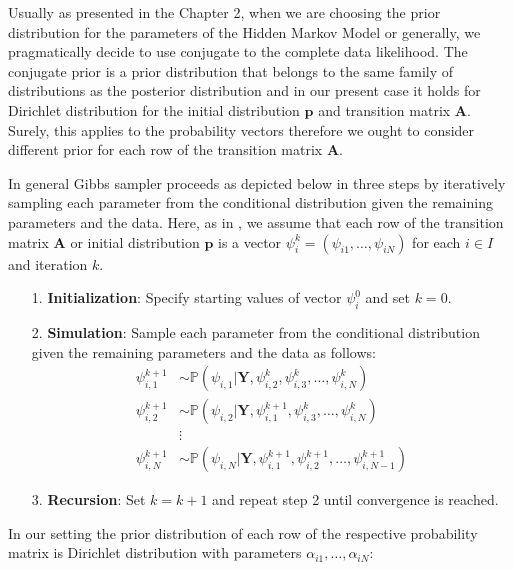 Usually as presented in the Chapter 2, when we are choosing the prior distribution for the parameters of the Hidden Markov Model or generally, we pragmatically
decide to use conjugate to the complete data likelihood. The conjugate prior is a prior distribution that belongs to the same family of distributions 
as the posterior distribution and in our present case it holds for Dirichlet distribution for the initial distribution $\textbf{p}$ and transition matrix $\textbf{A}$.
Surely, this applies to the probability vectors therefore we ought to consider different prior for each row of the transition matrix $\textbf{A}$. \citep{Rydén2008}

In general Gibbs sampler proceeds as depicted below in three steps by iteratively sampling each parameter from the conditional distribution given the remaining parameters 
and the data. Here, as in \citep{Chib1996}, we assume that each row of the transition matrix $\textbf{A}$ or initial distribution $\textbf{p}$ is a vector $\psi_i^k=(\psi_{i1},\ldots,\psi_{iN})$ for each $i \in I$ and iteration $k$.

\begin{itemize}
    \item[1.] \textbf{Initialization}: Specify starting values of vector $\psi_i^0$ and set $k=0$.
    \item[2.] \textbf{Simulation}: Sample each parameter from the conditional distribution given the remaining parameters and the data as follows:
    \begin{align*}
        \psi_{i,1}^{k+1} & \sim \mathbb{P}(\psi_{i,1}|\textbf{Y},\psi_{i,2}^k,\psi_{i,3}^k,\ldots,\psi_{i,N}^k) \\
        \psi_{i,2}^{k+1} & \sim \mathbb{P}(\psi_{i,2}|\textbf{Y},\psi_{i,1}^{k+1},\psi_{i,3}^k,\ldots,\psi_{i,N}^k) \\
        &\vdots\\
        \psi_{i,N}^{k+1} & \sim \mathbb{P}(\psi_{i,N}|\textbf{Y},\psi_{i,1}^{k+1},\psi_{i,2}^{k+1},\ldots,\psi_{i,N-1}^{k+1})
    \end{align*}
    
    \item[3.] \textbf{Recursion}: Set $k = k+1$ and repeat step 2 until convergence is reached.
\end{itemize}

In our setting the prior distribution of each row of the respective probability matrix is Dirichlet distribution with parameters $\alpha_{i1},\ldots,\alpha_{iN}$:

